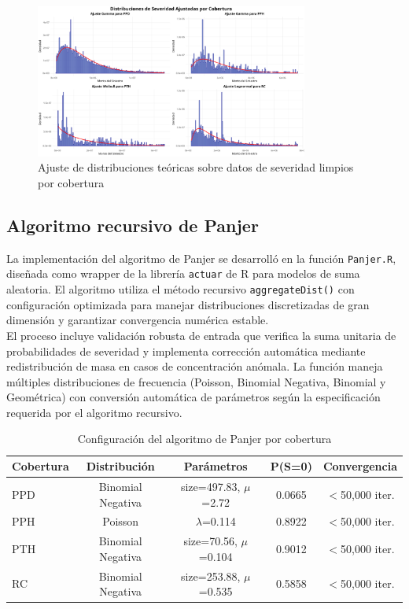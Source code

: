 \begin{figure}[H]
\centering
\includegraphics[width=0.8\textwidth]{../images/ajuste_distribuciones_severidad.png}
\caption{Ajuste de distribuciones teóricas sobre datos de severidad limpios por cobertura}
\end{figure}

\subsection{Algoritmo recursivo de Panjer}

La implementación del algoritmo de Panjer se desarrolló en la función \texttt{Panjer.R}, diseñada como wrapper de la librería \texttt{actuar} de R para modelos de suma aleatoria. El algoritmo utiliza el método recursivo \texttt{aggregateDist()} con configuración optimizada para manejar distribuciones discretizadas de gran dimensión y garantizar convergencia numérica estable.\\

El proceso incluye validación robusta de entrada que verifica la suma unitaria de probabilidades de severidad y implementa corrección automática mediante redistribución de masa en casos de concentración anómala. La función maneja múltiples distribuciones de frecuencia (Poisson, Binomial Negativa, Binomial y Geométrica) con conversión automática de parámetros según la especificación requerida por el algoritmo recursivo.

\begin{table}[H]
\centering
\caption{Configuración del algoritmo de Panjer por cobertura}
\begin{tabular}{lcccc}
\hline
\textbf{Cobertura} & \textbf{Distribución} & \textbf{Parámetros} & \textbf{P(S=0)} & \textbf{Convergencia} \\
\hline
PPD & Binomial Negativa & size=497.83, $\mu$=2.72 & 0.0665 & $<$50,000 iter. \\
PPH & Poisson & $\lambda$=0.114 & 0.8922 & $<$50,000 iter. \\
PTH & Binomial Negativa & size=70.56, $\mu$=0.104 & 0.9012 & $<$50,000 iter. \\
RC & Binomial Negativa & size=253.88, $\mu$=0.535 & 0.5858 & $<$50,000 iter. \\
\hline
\end{tabular}
\end{table}

